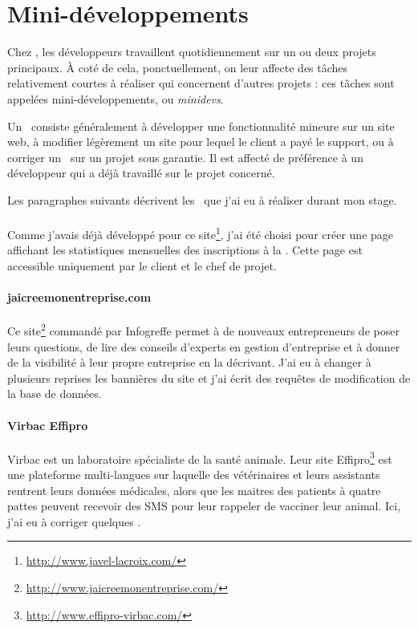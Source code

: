 \section{Mini-développements}
\label{minidev}

Chez \asl, les développeurs travaillent quotidiennement sur un ou deux projets principaux. À coté de cela, ponctuellement, on leur affecte des tâches relativement courtes à réaliser qui concernent d'autres projets : ces tâches sont appelées mini-développements, ou \emph{minidevs}.

Un \aminidev\ consiste généralement à développer une fonctionnalité mineure sur un site web, à modifier légèrement un site pour lequel le client a payé le support, ou à corriger un \abug\ sur un projet sous garantie. Il est affecté de préférence à un développeur qui a déjà travaillé sur le projet concerné. 

Les paragraphes suivants décrivent les \aminidevs\ que j'ai eu à réaliser durant mon stage.

\paragraph{\alc} Comme j'avais déjà développé pour ce site\footnote{\url{http://www.javel-lacroix.com/}}, j'ai été choisi pour créer une page affichant les statistiques mensuelles des inscriptions à la \anewsletter. Cette page est accessible uniquement par le client et le chef de projet.

\paragraph{jaicreemonentreprise.com} Ce site\footnote{\url{http://www.jaicreemonentreprise.com/}} commandé par Infogreffe permet à de nouveaux entrepreneurs de poser leurs questions, de lire des conseils d'experts en gestion d'entreprise et à donner de la visibilité à leur propre entreprise en la décrivant. J'ai eu à changer à plusieurs reprises les bannières du site et j'ai écrit des requêtes de modification de la base de données.

\paragraph{Virbac Effipro} Virbac est un laboratoire spécialiste de la santé animale. Leur site Effipro\footnote{\url{http://www.effipro-virbac.com/}} est une plateforme multi-langues sur laquelle des vé\-té\-ri\-nai\-res et leurs assistants rentrent leurs données médicales, alors que les maitres des patients à quatre pattes peuvent recevoir des SMS pour leur rappeler de vacciner leur animal. Ici, j'ai eu à corriger quelques \abugs.

